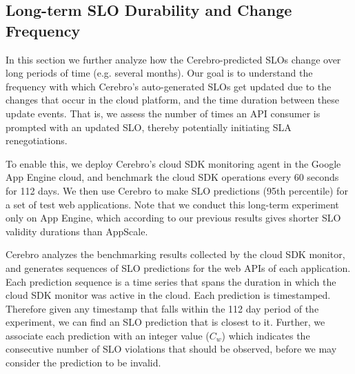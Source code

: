%

\subsection{Long-term SLO Durability and Change Frequency}
In this section we further analyze how the Cerebro-predicted SLOs change over 
long periods of time (e.g. several months). Our goal is to understand the frequency with
which Cerebro's auto-generated SLOs get updated due to the changes that occur in the 
cloud platform, and the time duration between these update events. That is,
we assess the number of times an API consumer is prompted with an updated SLO,
thereby potentially initiating SLA renegotiations.

To enable this, we deploy Cerebro's cloud 
SDK monitoring agent in the Google App Engine cloud, and benchmark
the cloud SDK operations every 60 seconds for 112 days. We then use Cerebro
to make SLO predictions (95th percentile) for a set of test 
web applications. Note that we conduct this long-term experiment only on
App Engine, which according to our previous results gives shorter SLO
validity durations than AppScale.

Cerebro analyzes the benchmarking results collected
by the cloud SDK monitor, and generates sequences of SLO predictions for the web APIs of each
application. Each prediction sequence
is a time series that spans the duration in which the cloud SDK monitor was active
in the cloud. Each prediction is timestamped. Therefore given any timestamp that falls within the
112 day period of the experiment, we can find an SLO prediction that is closest to it. 
Further, we associate each prediction with an integer value ($C_{w}$) which indicates the consecutive 
number of SLO violations that should be
observed, before we may consider the prediction to be invalid.

